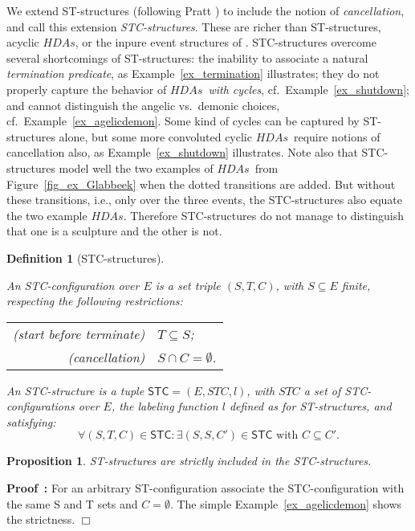 \documentclass[submission,copyright,creativecommons]{eptcs}
\newtheorem{proposition}[theorem]{Proposition}
\newtheorem{definition}[theorem]{Definition}
\newenvironment{proof}[1][\!\!\,]{\vspace{1ex}\noindent\textbf{Proof #1: }}{\hfill$\Box$\vspace{2ex}}
\newcommand\HDAs{\ensuremath{\mathit{HDAs}}}
\newcommand\STC{\ensuremath{\mathsf{STC}}}
\begin{document}
We extend ST-structures (following Pratt \cite{Pratt03trans_cancel}) to include the notion of \textit{cancellation}, and call this extension \textit{STC-structures}. These are richer than ST-structures, acyclic \HDAs, or the inpure event structures of \cite{GlabbeekP09configStruct}. 
STC-structures overcome several shortcomings of ST-structures: the inability to associate a natural \textit{termination predicate}, as Example~\ref{ex_termination} illustrates;  they do not properly capture the behavior of \textit{\HDAs\ with cycles}, cf.~Example~\ref{ex_shutdown}; and cannot distinguish the angelic vs.\ demonic choices, cf.~Example~\ref{ex_agelicdemon}. Some kind of cycles can be captured by ST-structures alone, but some more convoluted cyclic \HDAs\ require notions of cancellation also, as Example~\ref{ex_shutdown} illustrates. 
Note also that STC-structures model well the two examples of \HDAs\ from Figure~\ref{fig_ex_Glabbeek} when the dotted transitions are added. But without these transitions, i.e., only over the three events, the STC-structures also equate the two example \HDAs. Therefore STC-structures do not manage to distinguish that one is a sculpture and the other is not.

\begin{definition}[STC-structures]\label{def_STCstructures}\ 

An \emph{STC-configuration} over $E$ is a set triple $(S,T,C)$, with $S\subseteq E$ finite, respecting the following restrictions:
\begin{center}
\begin{tabular}{rl}
(start before terminate) & $T\subseteq S$;\\
(cancellation) & $S\cap C=\emptyset$.\\
\end{tabular} 
\end{center}
An \emph{STC-structure} is a tuple $\STC=(E,STC,l)$, with $STC$ a set of \emph{STC-configurations} over $E$, the labeling function $l$ defined as for ST-structures, and satisfying:
\[
\forall (S,T,C)\in\STC:\exists (S,S,C')\in\STC \mbox{ with }C\subseteq C'.
\]
\end{definition}

\begin{proposition}
ST-structures are strictly included in the STC-structures.
\end{proposition}

\begin{proof}
For an arbitrary ST-configuration associate the STC-configuration with the same S and T sets and $C=\emptyset$.
The simple Example~\ref{ex_agelicdemon} shows the strictness.
\end{proof}
\end{document}

